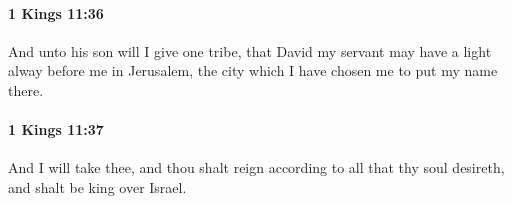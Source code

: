 		\paragraph{1 Kings 11:36} %
			\label{1KINGS-11-36}

			And unto his son will I give one tribe, that David my servant may have a light alway before me in Jerusalem, the city which I have chosen me to put my name there.


		\paragraph{1 Kings 11:37} %
			\label{1KINGS-11-37}

			And I will take thee, and thou shalt reign according to all that thy soul desireth, and shalt be king over Israel.


